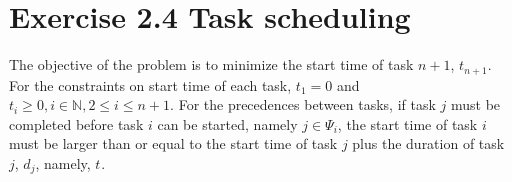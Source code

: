 \section{Exercise 2.4 Task scheduling}

The objective of the problem is to minimize the start time of task $n+1$, $t_{n+1}$. For the constraints on start time of each task, $t_1 = 0$ and $t_i \geq 0, i \in \mathbb{N}, 2 \leq i \leq n+1$. For the precedences between tasks, if task $j$ must be completed before task $i$ can be started, namely $j \in \Psi_i$, the start time of task $i$ must be larger than or equal to the start time of task $j$ plus the duration of task $j$, $d_j$, namely, $t_{}$.

